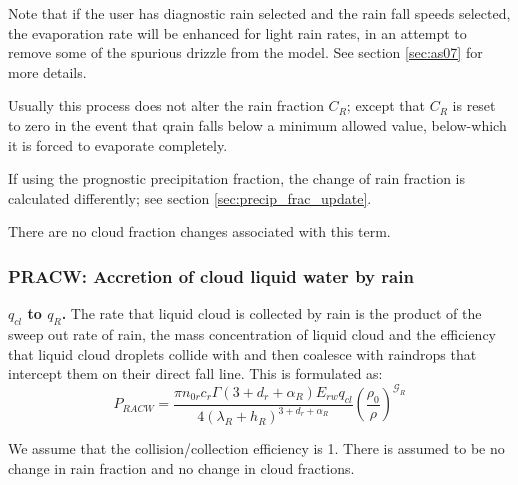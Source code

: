 \documentclass{UMDP_article}
\begin{document}
Note that if the user has diagnostic rain selected and 
the \cite{Abel:Shipway:2007} rain fall speeds selected, the evaporation rate 
will be enhanced for light rain rates, in an attempt to remove some of the 
spurious drizzle from the model. See section \ref{sec:as07} for more details.

Usually this process does not alter the rain fraction $C_R$;
except that $C_R$ is reset to zero in the event that qrain falls below
a minimum allowed value, below-which it is forced to evaporate completely.

If using the prognostic precipitation fraction, the change of rain fraction
is calculated differently; see section \ref{sec:precip_frac_update}.

There are no cloud fraction changes associated with this term.

\subsubsection{PRACW:  Accretion of cloud liquid water by rain}
\label{sec:PRACW}

\textbf{$q_{cl}$ to $q_{R}$.}
The rate that liquid cloud is collected by rain is the product of the sweep out
rate of rain, the mass concentration of liquid cloud and the efficiency that
liquid cloud droplets collide with and then coalesce with raindrops that intercept
them on their direct fall line. This is formulated as:
\begin{equation}
 P_{RACW}=\frac{\pi n_{0r} c_r  \Gamma (3+d_r+\alpha_R) E_{rw} {q_{cl}}}
            {4(\lambda_R+h_R)^{3+d_r+\alpha_R}}
        \left(\frac{\rho_0}{\rho}\right)^{\mathcal{G}_R}
 \label{eq:mic_pracw}
\end{equation}

We assume that the collision/collection efficiency is 1. There is assumed to
be no change in rain fraction and no change in cloud
fractions.
\end{document}
